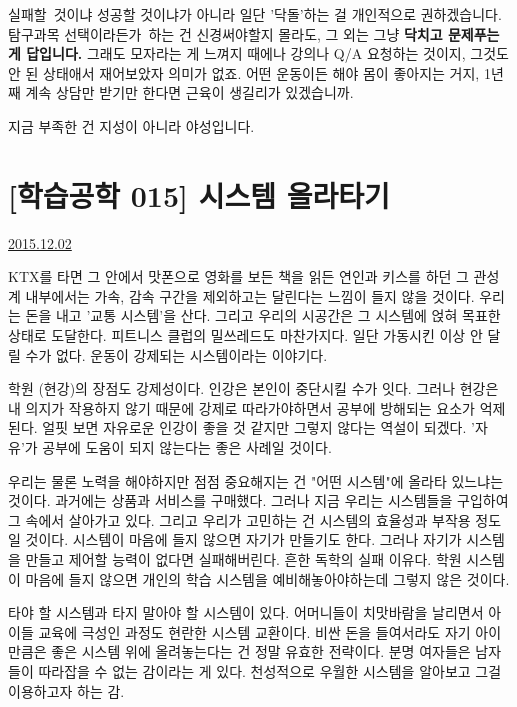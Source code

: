 실패할 것이냐 성공할 것이냐가 아니라 일단 '닥돌'하는 걸 개인적으로 권하겠습니다.
탐구과목 선택이라든가 하는 건 신경써야할지 몰라도, 그 외는 그냥 \textbf{닥치고 문제푸는 게 답입니다.}
그래도 모자라는 게 느껴지 때에나 강의나 Q/A 요청하는 것이지, 그것도 안 된 상태애서 재어보았자 의미가 없죠.
어떤 운동이든 해야 몸이 좋아지는 거지, 1년째 계속 상담만 받기만 한다면 근육이 생길리가 있겠습니까.
\vspace{5mm}

지금 부족한 건 지성이 아니라 야성입니다.
\vspace{5mm}


\section{[학습공학 015] 시스템 올라타기}
\href{https://www.kockoc.com/Apoc/523683}{2015.12.02}

\vspace{5mm}

KTX를 타면 그 안에서 맛폰으로 영화를 보든 책을 읽든 연인과 키스를 하던
그 관성계 내부에서는 가속, 감속 구간을 제외하고는 달린다는 느낌이 들지 않을 것이다.
우리는 돈을 내고 '교통 시스템'을 산다. 그리고 우리의 시공간은 그 시스템에 얹혀 목표한 상태로 도달한다.
피트니스 클럽의 밀쓰레드도 마찬가지다.
일단 가동시킨 이상 안 달릴 수가 없다. 운동이 강제되는 시스템이라는 이야기다.
\vspace{5mm}

학원 (현강)의 장점도 강제성이다. 인강은 본인이 중단시킬 수가 잇다.
그러나 현강은 내 의지가 작용하지 않기 때문에 강제로 따라가야하면서 공부에 방해되는 요소가 억제된다.
얼핏 보면 자유로운 인강이 좋을 것 같지만 그렇지 않다는 역설이 되겠다. '자유'가 공부에 도움이 되지 않는다는 좋은 사례일 것이다.
\vspace{5mm}

우리는 물론 노력을 해야하지만 점점 중요해지는 건 "어떤 시스템"에 올라타 있느냐는 것이다.
과거에는 상품과 서비스를 구매했다. 그러나 지금 우리는 시스템들을 구입하여 그 속에서 살아가고 있다.
그리고 우리가 고민하는 건 시스템의 효율성과 부작용 정도일 것이다.
시스템이 마음에 들지 않으면 자기가 만들기도 한다. 그러나 자기가 시스템을 만들고 제어할 능력이 없다면 실패해버린다.
흔한 독학의 실패 이유다. 학원 시스템이 마음에 들지 않으면 개인의 학습 시스템을 예비해놓아야하는데 그렇지 않은 것이다.
\vspace{5mm}

타야 할 시스템과 타지 말아야 할 시스템이 있다.
어머니들이 치맛바람을 날리면서 아이들 교육에 극성인 과정도 현란한 시스템 교환이다.
비싼 돈을 들여서라도 자기 아이만큼은 좋은 시스템 위에 올려놓는다는 건 정말 유효한 전략이다.
분명 여자들은 남자들이 따라잡을 수 없는 감이라는 게 있다. 천성적으로 우월한 시스템을 알아보고 그걸 이용하고자 하는 감.
\vspace{5mm}


